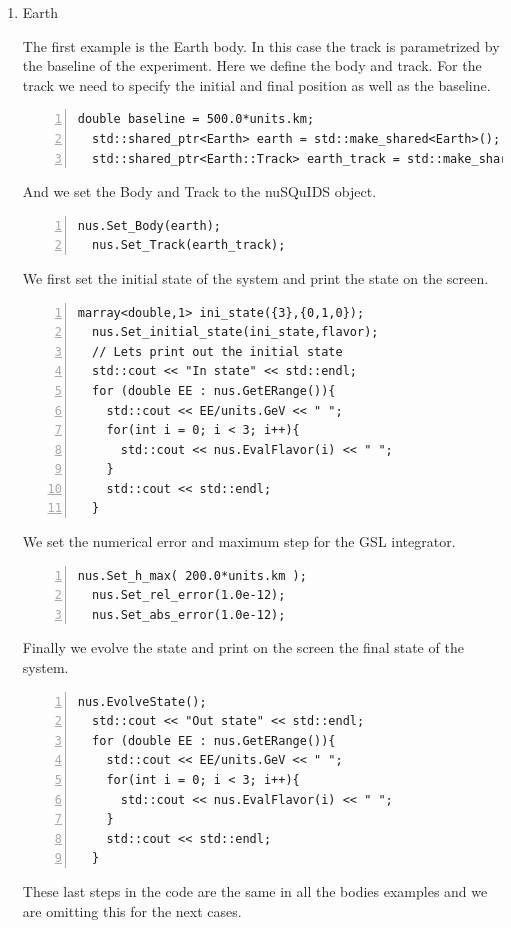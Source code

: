 \documentclass[3p,12pt]{elsarticle}
\newcommand{\ttf}{\ttfamily}
\begin{document}
\begin{enumerate}
\item {\ttf Earth}

The first example is the {\ttf Earth} body. In this case the track is
parametrized by the baseline of the experiment. Here we define the
body and track. For the track we need to specify the initial and final
position as well as the baseline. 
\begin{lstlisting}[frame=leftline, numbers =
  left,breaklines=true,label = ex:sin1,firstnumber=last]
  double baseline = 500.0*units.km;
  std::shared_ptr<Earth> earth = std::make_shared<Earth>();
  std::shared_ptr<Earth::Track> earth_track = std::make_shared<Earth::Track>(0.0,baseline,baseline);
\end{lstlisting}
And we set the Body and Track to the nuSQuIDS object.
\begin{lstlisting}[frame=leftline, numbers =
  left,breaklines=true,label = ex:sin1,firstnumber=last]
  nus.Set_Body(earth);
  nus.Set_Track(earth_track);
\end{lstlisting}

We first set the initial state of the system and print the state on
the screen.
\begin{lstlisting}[frame=leftline, numbers =
  left,breaklines=true,label = ex:sin1,firstnumber=last]
  marray<double,1> ini_state({3},{0,1,0});
  nus.Set_initial_state(ini_state,flavor);
  // Lets print out the initial state
  std::cout << "In state" << std::endl;
  for (double EE : nus.GetERange()){
    std::cout << EE/units.GeV << " ";
    for(int i = 0; i < 3; i++){
      std::cout << nus.EvalFlavor(i) << " ";
    }
    std::cout << std::endl;
  }
\end{lstlisting}
We set the numerical error and maximum step for the GSL integrator.
\begin{lstlisting}[frame=leftline, numbers =
  left,breaklines=true,label = ex:sin1,firstnumber=last]
  nus.Set_h_max( 200.0*units.km );
  nus.Set_rel_error(1.0e-12);
  nus.Set_abs_error(1.0e-12);
\end{lstlisting}

Finally we evolve the state and print on the screen the final state of
the system.
\begin{lstlisting}[frame=leftline, numbers =
  left,breaklines=true,label = ex:sin1,firstnumber=last]
  nus.EvolveState();
  std::cout << "Out state" << std::endl;
  for (double EE : nus.GetERange()){
    std::cout << EE/units.GeV << " ";
    for(int i = 0; i < 3; i++){
      std::cout << nus.EvalFlavor(i) << " ";
    }
    std::cout << std::endl;
  }
\end{lstlisting}
These last steps in the code are the same in all the bodies examples and we
are omitting this for the next cases.


\end{enumerate}
\end{document}
